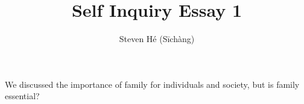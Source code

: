 \documentclass[12pt]{article}
\title{Self Inquiry Essay 1}
\author{Steven Hé (Sīchàng)}
\begin{document}
\maketitle
We discussed the importance of family for individuals and society,
but is family essential?

\cite{gittins1993family}
\pagebreak

{}
\end{document}
